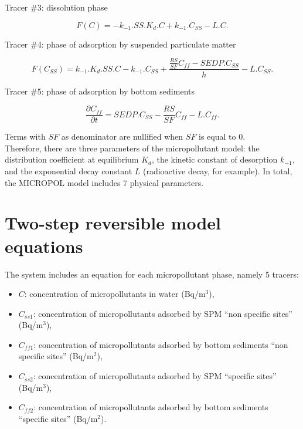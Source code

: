 Tracer $\#$3: dissolution phase

\begin{equation}
  F(C) = -k_{-1}.SS.K_d.C + k_{-1}.C_{SS} - L.C.
\end{equation}

Tracer $\#$4: phase of adsorption by suspended particulate matter

\begin{equation}
  F(C_{SS}) = k_{-1}.K_d.SS.C - k_{-1}.C_{SS} + \frac{\frac{RS}{SF}C_{ff}-SEDP.C_{SS}}{h}- L.C_{SS}.
\end{equation}

Tracer $\#$5: phase of adsorption by bottom sediments

\begin{equation}
  \frac{\partial C_{ff}}{\partial t} = SEDP.C_{SS} - \frac{RS}{SF} C_{ff} - L.C_{ff}.
\end{equation}

Terms with $SF$ as denominator are nullified when $SF$ is equal to 0.\\

Therefore, there are three parameters of the micropollutant model:
the distribution coefficient at equilibrium $K_d$,
the kinetic constant of desorption $k_{-1}$,
and the exponential decay constant $L$ (radioactive decay, for example).
In total, the MICROPOL model includes 7 physical parameters.

\section{Two-step reversible model equations}

The system includes an equation for each micropollutant phase, namely 5 tracers:

\begin{itemize}
\item $C$: concentration of micropollutants in water (Bq/m$^3$),
\item $C_{ss1}$: concentration of micropollutants adsorbed by SPM ``non specific sites''
  (Bq/m$^3$),
\item $C_{ff1}$: concentration of micropollutants adsorbed by bottom sediments
  ``non specific sites'' (Bq/m$^2$),
\item $C_{ss2}$: concentration of micropollutants adsorbed by SPM ``specific sites''
  (Bq/m$^3$),
\item $C_{ff2}$: concentration of micropollutants adsorbed by bottom sediments
  ``specific sites'' (Bq/m$^2$).
\end{itemize}


